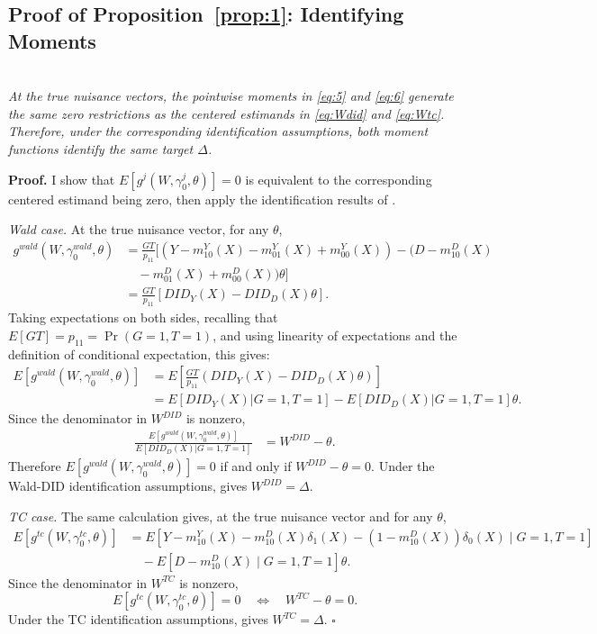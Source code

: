 \subsection{Proof of Proposition~\ref{prop:1}: Identifying Moments}\label{sec:app_proof_prop1}
\begin{propproof}

\noindent \\
\textit{At the true nuisance vectors, the pointwise moments in \eqref{eq:5} and \eqref{eq:6} generate the same zero restrictions as the centered estimands in \eqref{eq:Wdid} and \eqref{eq:Wtc}. Therefore, under the corresponding identification assumptions, both moment functions identify the same target $\Delta$.}

\medskip
\noindent\textbf{Proof.} I show that $E[g^j(W,\gamma^j_0,\theta)]=0$ is equivalent to the corresponding centered estimand being zero, then apply the identification results of \cite{fuzzy2018}.

\medskip
\noindent\textit{Wald case.} At the true nuisance vector, for any $\theta$,
\begin{align*}
    g^{wald}(W,\gamma^{wald}_0,\theta) &= \frac{GT}{p_{11}}\big[(Y-m^Y_{10}(X)-m^Y_{01}(X)+m^Y_{00}(X))- (D-m^D_{10}(X) \\
    &\quad -m^D_{01}(X)+m^D_{00}(X))\theta\big] \\
     &= \frac{GT}{p_{11}}[DID_Y(X)-DID_D(X)\theta].
\end{align*}
Taking expectations on both sides, recalling that $E[GT]=p_{11}=\Pr(G=1,T=1)$, and using linearity of expectations and the definition of conditional expectation, this gives:
\begin{align*}
    E[g^{wald}(W,\gamma^{wald}_0,\theta)] &= E\left[\frac{GT}{p_{11}}(DID_Y(X)-DID_D(X)\theta)\right]  \\
    &= E\left[DID_Y(X)|G=1,T=1\right] - E\left[DID_D(X)|G=1,T=1\right]\theta.
\end{align*}
Since the denominator in $W^{DID}$ is nonzero,
\begin{align*}
    \frac{E[g^{wald}(W,\gamma^{wald}_0,\theta)]}
    {E\left[DID_D(X)|G=1,T=1\right]}
    &= W^{DID} - \theta.
\end{align*}
Therefore $E[g^{wald}(W,\gamma^{wald}_0,\theta)]=0$ if and only if $W^{DID}-\theta=0$. Under the Wald-DID identification assumptions, \citet{fuzzy2018} gives $W^{DID}=\Delta$.

\noindent\textit{TC case.} The same calculation gives, at the true nuisance vector and for any $\theta$,
\begin{align*}
    E[g^{tc}(W,\gamma^{tc}_0,\theta)]
    &= E\left[Y-m^Y_{10}(X)-m^D_{10}(X)\delta_1(X)-(1-m^D_{10}(X))\delta_0(X)\mid G=1,T=1\right] \\
    &\quad - E\left[D-m^D_{10}(X)\mid G=1,T=1\right]\theta.
\end{align*}
Since the denominator in $W^{TC}$ is nonzero,
\[
    E[g^{tc}(W,\gamma^{tc}_0,\theta)]=0
    \quad\Longleftrightarrow\quad
    W^{TC}-\theta=0.
\]
Under the TC identification assumptions, \citet{fuzzy2018} gives $W^{TC}=\Delta$. $\square$

\end{propproof}

